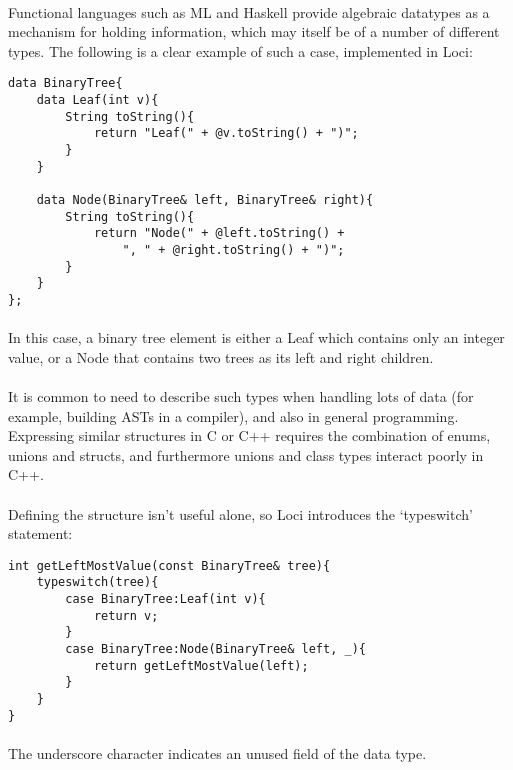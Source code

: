 \documentclass[12pt,twoside,notitlepage]{report}
\begin{document}
\paragraph{}
Functional languages such as ML and Haskell provide algebraic datatypes as a mechanism for holding information, which may itself be of a number of different types. The following is a clear example of such a case, implemented in Loci:


\begin{lstlisting}
data BinaryTree{
	data Leaf(int v){
		String toString(){
			return "Leaf(" + @v.toString() + ")";
		}
	}
	
	data Node(BinaryTree& left, BinaryTree& right){
		String toString(){
			return "Node(" + @left.toString() +
				", " + @right.toString() + ")";
		}
	}
};
\end{lstlisting}


\paragraph{}
In this case, a binary tree element is either a Leaf which contains only an integer value, or a Node that contains two trees as its left and right children.

\paragraph{}
It is common to need to describe such types when handling lots of data (for example, building ASTs in a compiler), and also in general programming. Expressing similar structures in C or C++ requires the combination of enums, unions and structs, and furthermore unions and class types interact poorly in C++.

\paragraph{}
Defining the structure isn't useful alone, so Loci introduces the `typeswitch' statement:


\begin{lstlisting}
int getLeftMostValue(const BinaryTree& tree){
	typeswitch(tree){
		case BinaryTree:Leaf(int v){
			return v;
		}
		case BinaryTree:Node(BinaryTree& left, _){
			return getLeftMostValue(left);
		}
	}
}
\end{lstlisting}


\paragraph{}
The underscore character indicates an unused field of the data type.
\end{document}
